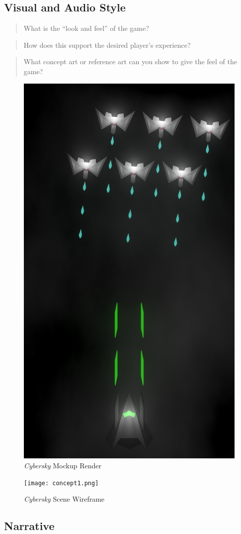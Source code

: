 \documentclass{scrartcl}
\begin{document}
\subsection{Visual and Audio Style}
\begin{quote}
  What is the “look and feel” of the game?
\end{quote}

\begin{quote}
  How does this support the desired player’s experience?
\end{quote}

\begin{quote}
  What concept art or reference art can you show to give the feel of the game?
\end{quote}

\begin{figure}[ht]
  \centering
  \includegraphics[width=.5\columnwidth]{mockup-01.png}
  \caption[\textit{Cybersky}]{\textit{Cybersky} Mockup Render}
\end{figure}

\begin{figure}[ht]
  \centering
  \texttt{[image: concept1.png]}
  \caption[\textit{Cybersky}]{\textit{Cybersky} Scene Wireframe}
\end{figure}

\subsection{Narrative}
\end{document}
